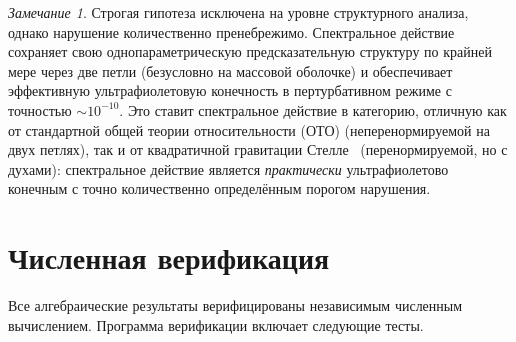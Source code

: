 \documentclass[12pt,a4paper]{article}
\theoremstyle{definition}
\theoremstyle{remark}
\newtheorem{remark}[theorem]{Замечание}
\begin{document}
\begin{remark}
Строгая гипотеза исключена на уровне структурного анализа, однако нарушение количественно пренебрежимо.
Спектральное действие сохраняет свою однопараметрическую предсказательную
структуру по крайней мере через две петли (безусловно на массовой оболочке)
и обеспечивает эффективную ультрафиолетовую конечность в пертурбативном
режиме с точностью $\sim 10^{-10}$.  Это ставит спектральное действие в
категорию, отличную как от стандартной общей теории относительности (ОТО) (неперенормируемой на двух
петлях), так и от квадратичной гравитации
Стелле~\cite{Stelle:1976gc} (перенормируемой, но с духами): спектральное
действие является \emph{практически} ультрафиолетово конечным с точно
количественно определённым порогом нарушения.
\end{remark}


\section{Численная верификация}
\label{sec:numerical}

Все алгебраические результаты верифицированы независимым численным
вычислением.  Программа верификации включает следующие тесты.
\end{document}
